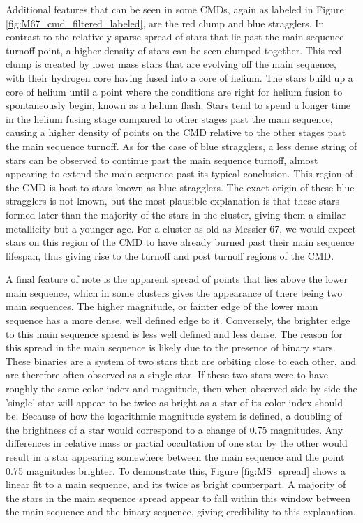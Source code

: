 \documentclass[onecolumn,table,xcdraw,super]{aastex631}
\begin{document}
Additional features that can be seen in some CMDs, again as labeled in Figure \ref{fig:M67_cmd_filtered_labeled}, are the red clump and blue stragglers. In contrast to the relatively sparse spread of stars that lie past the main sequence turnoff point, a higher density of stars can be seen clumped together. This red clump is created by lower mass stars that are evolving off the main sequence, with their hydrogen core having fused into a core of helium. The stars build up a core of helium until a point where the conditions are right for helium fusion to spontaneously begin, known as a helium flash. Stars tend to spend a longer time in the helium fusing stage compared to other stages past the main sequence, causing a higher density of points on the CMD relative to the other stages past the main sequence turnoff. As for the case of blue stragglers, a less dense string of stars can be observed to continue past the main sequence turnoff, almost appearing to extend the main sequence past its typical conclusion. This region of the CMD is host to stars known as blue stragglers. The exact origin of these blue stragglers is not known, but the most plausible explanation is that these stars formed later than the majority of the stars in the cluster, giving them a similar metallicity but a younger age. For a cluster as old as Messier 67, we would expect stars on this region of the CMD to have already burned past their main sequence lifespan, thus giving rise to the turnoff and post turnoff regions of the CMD.

A final feature of note is the apparent spread of points that lies above the lower main sequence, which in some clusters gives the appearance of there being two main sequences. The higher magnitude, or fainter edge of the lower main sequence has a more dense, well defined edge to it. Conversely, the brighter edge to this main sequence spread is less well defined and less dense. The reason for this spread in the main sequence is likely due to the presence of binary stars. These binaries are a system of two stars that are orbiting close to each other, and are therefore often observed as a single star. If these two stars were to have roughly the same color index and magnitude, then when observed side by side the 'single' star will appear to be twice as bright as a star of its color index should be. Because of how the logarithmic magnitude system is defined, a doubling of the brightness of a star would correspond to a change of 0.75 magnitudes. Any differences in relative mass or partial occultation of one star by the other would result in a star appearing somewhere between the main sequence and the point 0.75 magnitudes brighter. To demonstrate this, Figure \ref{fig:MS_spread} shows a linear fit to a main sequence, and its twice as bright counterpart. A majority of the stars in the main sequence spread appear to fall within this window between the main sequence and the binary sequence, giving credibility to this explanation.
\end{document}
